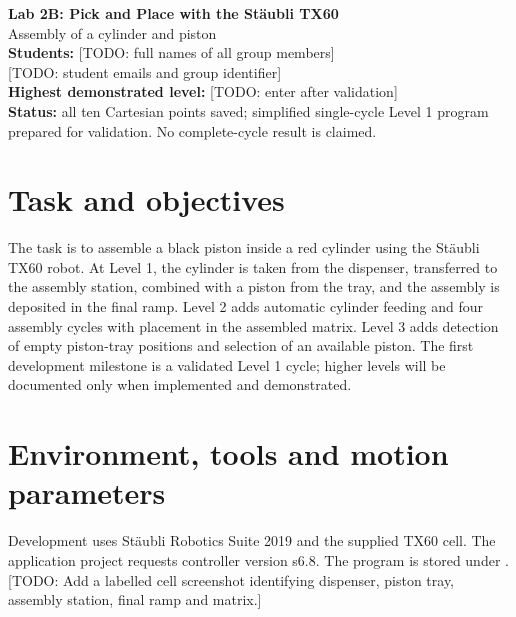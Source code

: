 \documentclass[12pt]{article}
\newcommand{\pending}[1]{\textcolor{blue!65!black}{[TODO: #1]}}
\begin{document}
\begin{center}
{\LARGE\bfseries Lab 2B: Pick and Place with the Stäubli TX60}\\[8pt]
{\large Assembly of a cylinder and piston}\\[6pt]
\textbf{Students:} \pending{full names of all group members}\\
\pending{student emails and group identifier}\\
\textbf{Highest demonstrated level:} \pending{enter after validation}\\
\textbf{Status:} all ten Cartesian points saved; simplified single-cycle Level 1 program prepared for validation. No complete-cycle result is claimed.
\end{center}

\section{Task and objectives}
The task is to assemble a black piston inside a red cylinder using the Stäubli TX60 robot. At Level 1, the cylinder is taken from the dispenser, transferred to the assembly station, combined with a piston from the tray, and the assembly is deposited in the final ramp. Level 2 adds automatic cylinder feeding and four assembly cycles with placement in the assembled matrix. Level 3 adds detection of empty piston-tray positions and selection of an available piston.
The first development milestone is a validated Level 1 cycle; higher levels will be documented only when implemented and demonstrated.

\section{Environment, tools and motion parameters}
Development uses Stäubli Robotics Suite 2019 and the supplied TX60 cell. The application project requests controller version s6.8. The program is stored under .
\pending{Add a labelled cell screenshot identifying dispenser, piston tray, assembly station, final ramp and matrix.}
\end{document}
